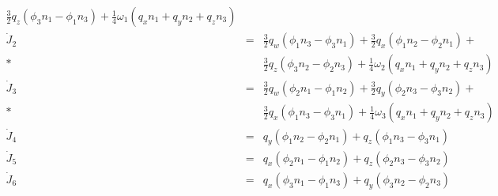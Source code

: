 \begin{eqnarray}
                \frac{3}{2} q_z (\phi_3 n_1 - \phi_1 n_3) +
                \frac{1}{4} \omega_1 (q_x n_1 + q_y n_2 + q_z n_3) \nonumber\\
\dot{J}_2 & = & \frac{3}{2} q_w (\phi_1 n_3 - \phi_3 n_1) +
                \frac{3}{2} q_x (\phi_1 n_2 - \phi_2 n_1) + \nonumber\\*&&
                \frac{3}{2} q_z (\phi_3 n_2 - \phi_2 n_3) +
                \frac{1}{4} \omega_2 (q_x n_1 + q_y n_2 + q_z n_3) \nonumber\\
\dot{J}_3 & = & \frac{3}{2} q_w (\phi_2 n_1 - \phi_1 n_2) +
                \frac{3}{2} q_y (\phi_2 n_3 - \phi_3 n_2) + \nonumber\\*&&
                \frac{3}{2} q_x (\phi_1 n_3 - \phi_3 n_1) +
                \frac{1}{4} \omega_3 (q_x n_1 + q_y n_2 + q_z n_3) \nonumber\\
\dot{J}_4 & = & q_y (\phi_1 n_2 - \phi_2 n_1) + q_z (\phi_1 n_3 - \phi_3 n_1) \nonumber\\
\dot{J}_5 & = & q_x (\phi_2 n_1 - \phi_1 n_2) + q_z (\phi_2 n_3 - \phi_3 n_2) \nonumber\\
\dot{J}_6 & = & q_x (\phi_3 n_1 - \phi_1 n_3) + q_y (\phi_3 n_2 - \phi_2 n_3) \nonumber
\end{eqnarray}
